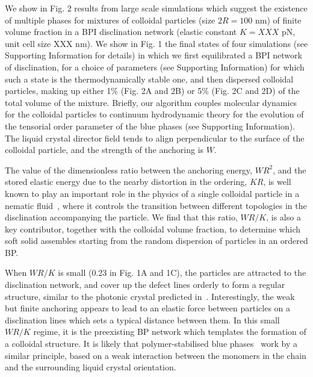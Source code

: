 \documentclass[12pt]{article}
\begin{document}
We show in Fig. 2 results from large scale simulations which suggest the
existence of multiple phases for mixtures of colloidal particles 
(size $2R=100$ nm) of finite volume fraction in a BPI disclination network
(elastic constant $K= XXX$ pN, unit cell size XXX nm). 
We show in Fig. 1 the final states of four simulations (see Supporting 
Information for 
details) in which we first equilibrated 
a BPI network of disclination, for a choice of parameters (see Supporting
Information) 
for which such a state is the thermodynamically stable one, and then 
dispersed colloidal
particles, making up either 1\% (Fig. 2A and 2B) or 5\% (Fig. 2C and 2D)
of the total volume of the mixture. Briefly, our algorithm couples molecular
dynamics for the colloidal particles to continuum hydrodynamic theory
for the evolution of the tensorial order parameter of 
the blue phases (see Supporting Information). 
The liquid crystal director field tends
to align perpendicular to the surface of the colloidal particle, and
the strength of the anchoring is $W$. 

The value of the dimensionless ratio between the anchoring energy, $WR^2$, 
and the stored elastic energy due to the
nearby distortion in the ordering, $KR$, is well known to 
play an important role in the physics of a single colloidal particle
in a nematic fluid~\cite{stark}, where it controls the transition
between different topologies in the disclination accompanying the particle.
We find that this ratio, $WR/K$, is also a key contributor, together
with the colloidal volume fraction, to determine which soft solid assembles
starting from the random dispersion of particles in an ordered BP. 



When $WR/K$ is small (0.23 in Fig. 1A and 1C), the particles are
attracted to the disclination network, and cover up the defect lines
orderly to form a regular structure, similar to the photonic crystal
predicted in~\cite{miha}. Interestingly, the weak but finite anchoring
appears to lead to an elastic force between particles on a disclination lines
which sets a typical distance between them. In this
small $WR/K$ regime, it is the preexisting BP network which templates
the formation of a colloidal structure. It is likely that polymer-stabilised 
blue phases~\cite{kikuchi} 
work by a similar principle, based on a weak interaction between 
the monomers in the chain and the surrounding liquid crystal orientation. 
\end{document}
